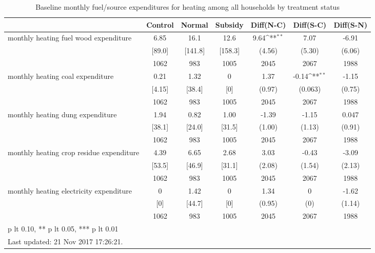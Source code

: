 \begin{table}[htbp]\centering
\def\sym#1{\ifmmode^{#1}\else\(^{#1}\)\fi}
\caption{Baseline monthly fuel/source expenditures for heating among all households by treatment status \label{tab:"balance"}}
\begin{tabular*}{1\hsize}{@{\hskip\tabcolsep\extracolsep\fill}l*{1}{cccccc}}
\toprule
                                &  Control&   Normal&  Subsidy&Diff(N-C)         &Diff(S-C)         &Diff(S-N)         \\
\midrule
monthly heating fuel wood expenditure&     6.85&     16.1&     12.6&     9.64\sym{**} &     7.07         &    -6.91         \\
                                &   [89.0]&  [141.8]&  [158.3]&   (4.56)         &   (5.30)         &   (6.06)         \\
                                &     1062&      983&     1005&     2045         &     2067         &     1988         \\
monthly heating coal expenditure&     0.21&     1.32&        0&     1.37         &    -0.14\sym{**} &    -1.15         \\
                                &   [4.15]&   [38.4]&      [0]&   (0.97)         &  (0.063)         &   (0.75)         \\
                                &     1062&      983&     1005&     2045         &     2067         &     1988         \\
monthly heating dung expenditure&     1.94&     0.82&     1.00&    -1.39         &    -1.15         &    0.047         \\
                                &   [38.1]&   [24.0]&   [31.5]&   (1.00)         &   (1.13)         &   (0.91)         \\
                                &     1062&      983&     1005&     2045         &     2067         &     1988         \\
monthly heating crop residue expenditure&     4.39&     6.65&     2.68&     3.03         &    -0.43         &    -3.09         \\
                                &   [53.5]&   [46.9]&   [31.1]&   (2.08)         &   (1.54)         &   (2.13)         \\
                                &     1062&      983&     1005&     2045         &     2067         &     1988         \\
monthly heating electricity expenditure&        0&     1.42&        0&     1.34         &        0         &    -1.62         \\
                                &      [0]&   [44.7]&      [0]&   (0.95)         &      (0)         &   (1.14)         \\
                                &     1062&      983&     1005&     2045         &     2067         &     1988         \\
\bottomrule
\multicolumn{7}{l}{\footnotesize * p lt 0.10, ** p lt 0.05, *** p lt 0.01}\\
\multicolumn{7}{l}{\footnotesize Last updated: 21 Nov 2017 17:26:21.}\\
\end{tabular*}
\end{table}
